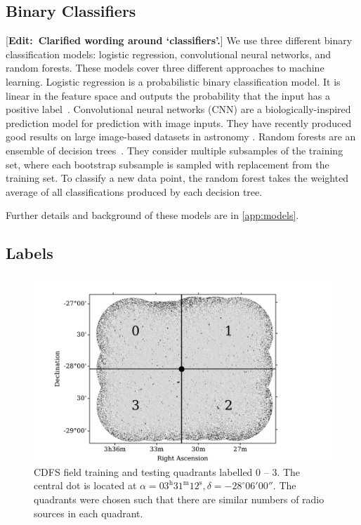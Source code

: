 \documentclass[fleqn,usenatbib,usedcolumn]{mnras}
\newcommand{\edit}[1]{ {\color{red}[{\bf Edit:~{#1}}]} }
\begin{document}
  \subsection{Binary Classifiers}\label{sec:classifiers}

    \edit{Clarified wording around `classifiers'.} We use three different binary classification models: logistic regression, convolutional neural networks, and random forests. These models cover three different approaches to machine learning. Logistic regression is a probabilistic binary classification model. It is linear in the feature space and outputs the probability that the input has a positive label~\citep[Chap. 4]{bishop06ml}. Convolutional neural networks (CNN) are a biologically-inspired prediction model for prediction with image inputs. They have recently produced good results on large image-based datasets in astronomy \citep[e.g.][Lukic et al. in press]{dieleman15cnn}. Random forests are an ensemble of decision trees~\citep{breiman01random-forest}. They consider multiple subsamples of the training set, where each bootstrap subsample is sampled with replacement from the training set. To classify a new data point, the random forest takes the weighted average of all classifications produced by each decision tree.

    Further details and background of these models are in \autoref{app:models}.

  \subsection{Labels}\label{sec:labels}
    \begin{figure}
      \centering
      \includegraphics[width=\columnwidth]{images/quadrants.pdf}
      \caption{CDFS field training and testing quadrants labelled 0 -- 3. The
        central dot is located at $\alpha = 03^\text{h}31^\text{m}12^\text{s},
        \delta = -28^\circ{}06'00''$. The quadrants were chosen such that
        there are similar numbers of radio sources in each
        quadrant.\label{fig:quadrants}}
    \end{figure}
\end{document}
